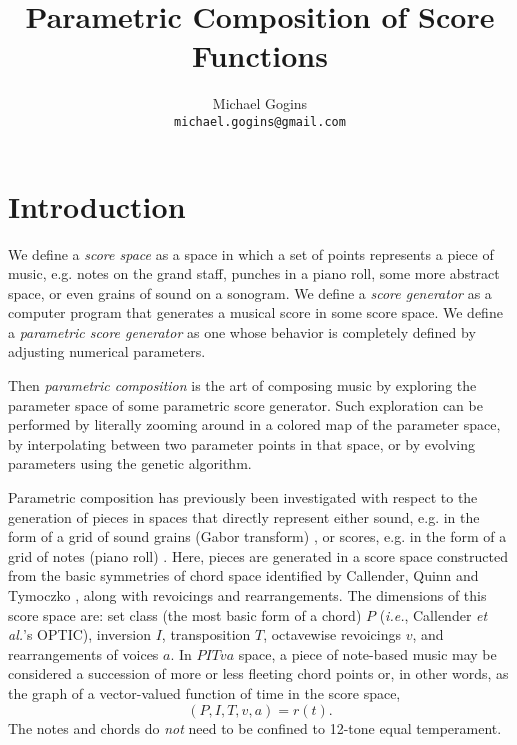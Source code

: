 \documentclass[english,11pt,letterpaper,onecolumn]{scrartcl}
\begin{document}
\title{Parametric Composition of Score Functions}
\author{Michael Gogins \\ \texttt{michael.gogins@gmail.com}}
\maketitle


\section{Introduction}

We define a \textit{score space} as a space in which a set of points represents 
a piece of music, e.g. notes on the grand staff, punches in a piano roll, some more abstract 
space, or even grains of sound on a sonogram. We define a 
\textit{score generator} as a computer program that generates a musical score 
in some score space. We define a \textit{parametric score generator} as one 
whose behavior is completely defined by adjusting numerical parameters. 

Then \textit{parametric composition} is the art of composing music by exploring the 
parameter space of some parametric score generator. Such exploration can be 
performed by literally zooming around in a colored map of the parameter space, 
by interpolating between two parameter points in that space, or by evolving 
parameters using the genetic algorithm. 

Parametric composition has previously been investigated with respect to 
the generation of pieces in spaces that directly represent either sound, 
e.g. in the form of a grid of sound grains (Gabor transform) \cite{obsessed}, 
or scores, e.g. in the form of a grid of notes (piano roll) \cite{ifsmusic}. 
Here, pieces are generated in a score space constructed from the basic 
symmetries of chord space identified by Callender, 
Quinn and Tymoczko \cite{callender:346}, along with revoicings and 
rearrangements. The dimensions of this score space are: set class 
(the most basic form of a chord) $P$ (\textit{i.e.}, Callender \textit{et al.}'s OPTIC), 
inversion $I$, transposition $T$, octavewise revoicings $v$, and 
rearrangements of voices $a$. In $PITva$ space, a piece of note-based music may 
be considered a succession of more or less fleeting chord points or, in other 
words, as the graph of a vector-valued function of time in the score space, 
$$(P, I, T, v, a) = r(t).$$ The notes and chords do \textit{not} need to be 
confined to 12-tone 
equal temperament.
\end{document}
